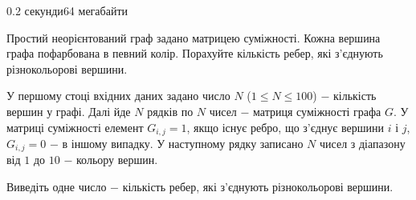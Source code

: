 \begin{problem}{}{}{}{0.2 секунди}{64 мегабайти}

Простий неорієнтований граф задано матрицею суміжності. Кожна вершина графа пофарбована в певний колір.
Порахуйте кількість ребер, які з'єднують різнокольорові вершини.

\InputFile
У першому стоці вхідних даних задано число $N$ ($1 \le N \le 100$) $-$ кількість вершин у графі.
Далі йде $N$ рядків по $N$ чисел $-$ матриця суміжності графа $G$.
У матриці суміжності елемент $G_{i,j}=1$, якщо існує ребро, що з'єднує вершини $i$ і $j$, $G_{i,j}=0$ $-$ в іншому випадку.
У наступному рядку записано $N$ чисел з діапазону від $1$ до $10$ $-$ кольору вершин.

\OutputFile
Виведіть одне число $-$ кількість ребер, які з'єднують різнокольорові вершини.

\Example

\begin{example}
\end{example}

\end{problem}
